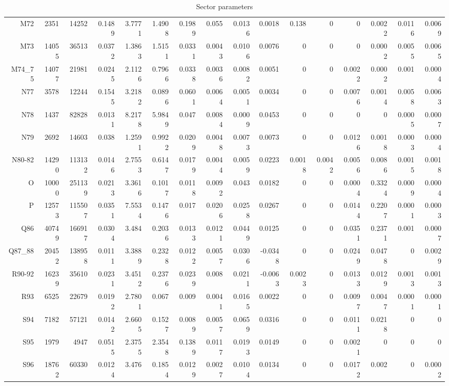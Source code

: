 \begin{table}
\begin{tabular}{rrrrrrrrrrrrrrrr}
M72 & 2351 & 14252 & 0.1489 & 3.7771 & 1.4908 & 0.1989 & 0.055 & 0.0136 & 0.0018 & 0.138 & 0 & 0 & 0.0022 & 0.0116 & 0.0069 \\
M73 & 14055 & 36513 & 0.0372 & 1.3863 & 1.5151 & 0.0331 & 0.0043 & 0.0106 & 0.0076 & 0 & 0 & 0 & 0.0002 & 0.0055 & 0.0065 \\
M74\_75 & 14077 & 21981 & 0.0245 & 2.1126 & 0.7966 & 0.0338 & 0.0036 & 0.0082 & 0.0051 & 0 & 0 & 0.0022 & 0.0002 & 0.001 & 0.0004 \\
N77 & 3578 & 12244 & 0.1545 & 3.2182 & 0.0896 & 0.0601 & 0.0064 & 0.0051 & 0.0034 & 0 & 0 & 0.0076 & 0.0014 & 0.0058 & 0.0063 \\
N78 & 1437 & 82828 & 0.0131 & 8.2178 & 5.9849 & 0.047 & 0.0084 & 0.0009 & 0.0453 & 0 & 0 & 0 & 0 & 0.0005 & 0.0007 \\
N79 & 2692 & 14603 & 0.038 & 1.2591 & 0.9922 & 0.0209 & 0.0048 & 0.0073 & 0.0073 & 0 & 0 & 0.0126 & 0.0018 & 0.0003 & 0.0004 \\
N80-82 & 14290 & 113132 & 0.0146 & 2.7553 & 0.6147 & 0.0179 & 0.0044 & 0.0059 & 0.0223 & 0.0018 & 0.0042 & 0.0056 & 0.0086 & 0.0015 & 0.0018 \\
O & 10000 & 251139 & 0.0213 & 3.3616 & 0.1017 & 0.0118 & 0.0092 & 0.043 & 0.0182 & 0 & 0 & 0.0004 & 0.3324 & 0.0009 & 0.0004 \\
P & 12573 & 115507 & 0.0351 & 7.5534 & 0.1476 & 0.017 & 0.0206 & 0.0258 & 0.0267 & 0 & 0 & 0.0144 & 0.2207 & 0.0001 & 0.0003 \\
Q86 & 40749 & 166917 & 0.0304 & 3.484 & 0.2036 & 0.0133 & 0.0121 & 0.0449 & 0.0125 & 0 & 0 & 0.0351 & 0.2371 & 0.001 & 0.0007 \\
Q87\_88 & 20452 & 138958 & 0.0111 & 3.3889 & 0.2328 & 0.0122 & 0.0057 & 0.0306 & -0.0348 & 0 & 0 & 0.0249 & 0.0478 & 0 & 0.0029 \\
R90-92 & 16239 & 35610 & 0.0231 & 3.4512 & 0.2376 & 0.0239 & 0.008 & 0.0211 & -0.0063 & 0.0023 & 0 & 0.0133 & 0.0129 & 0.0013 & 0.0013 \\
R93 & 6525 & 22679 & 0.0192 & 2.7801 & 0.067 & 0.009 & 0.0041 & 0.0165 & 0.0022 & 0 & 0 & 0.0097 & 0.0047 & 0.0001 & 0.0001 \\
S94 & 7182 & 57121 & 0.0142 & 2.6605 & 0.1527 & 0.0089 & 0.0057 & 0.0659 & 0.0316 & 0 & 0 & 0.0111 & 0.0218 & 0 & 0 \\
S95 & 1979 & 4947 & 0.0515 & 2.3755 & 2.3548 & 0.1389 & 0.0117 & 0.0193 & 0.0149 & 0 & 0 & 0.0021 & 0 & 0 & 0 \\
S96 & 18762 & 60330 & 0.0124 & 3.476 & 0.1854 & 0.0129 & 0.0027 & 0.0104 & 0.0134 & 0 & 0 & 0.0172 & 0.002 & 0 & 0.0002 \\
\end{tabular}
\caption{Sector parameters}
\label{table:sector_parameters}
\end{table}
